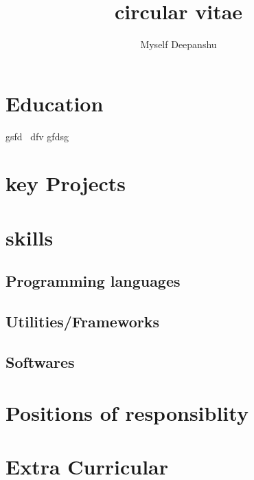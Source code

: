 \documentclass[10pt]{article}
\begin{document}
\title{circular vitae}
\author{Myself Deepanshu}
\maketitle
\section{Education}
gsfd \latex\ dfv  gfdsg
\section{key Projects}
\section{skills}
\subsection{Programming languages}
\subsection{Utilities/Frameworks}
\subsection{Softwares}
\section{Positions of responsiblity}
\section{Extra Curricular}
\end{document}
